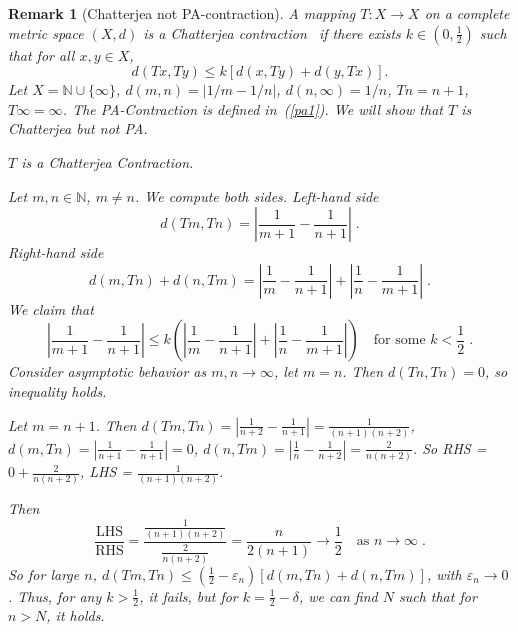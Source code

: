 \documentclass[11pt]{article}
\newtheorem{remark}[theorem]{Remark}
\begin{document}
\begin{remark}[Chatterjea not PA-contraction]
A mapping $ T: X \to X $ on a complete metric space $ (X,d) $ is a Chatterjea contraction~\cite{Chatterjea1972} if there exists $ k \in (0, \frac{1}{2}) $ such that for all $ x, y \in X $,
\begin{equation}
d(Tx, Ty) \leq k \left[ d(x, Ty) + d(y, Tx) \right].
\label{chatterjea}
\end{equation}
Let $ X = \mathbb{N} \cup \{\infty\} $, $ d(m,n) = |1/m - 1/n| $, $ d(n,\infty) 
= 1/n $, $ Tn = n+1 $, $ T\infty = \infty $. 
The PA-Contraction is defined in~(\ref{pa1}). We will show that $T$ is Chatterjea but not PA.


$ T $ is a Chatterjea Contraction.

Let $ m, n \in \mathbb{N} $, $ m \ne n $. We compute both sides.
Left-hand side
\begin{equation}
d(Tm, Tn) = \left| \frac{1}{m+1} - \frac{1}{n+1} \right| \; .
\end{equation}
Right-hand side
\begin{equation}
d(m, Tn) + d(n, Tm) = \left| \frac{1}{m} - \frac{1}{n+1} \right| + \left| \frac{1}{n} - \frac{1}{m+1} \right| \; .
\end{equation}
We claim that
\begin{equation}
\left| \frac{1}{m+1} - \frac{1}{n+1} \right| \leq k \left( \left| \frac{1}{m} - \frac{1}{n+1} \right| + \left| \frac{1}{n} - \frac{1}{m+1} \right| \right)
\quad \text{for some } k < \frac{1}{2} \;.
\end{equation}
Consider asymptotic behavior as $ m, n \to \infty $,
let $ m = n $. Then
$ d(Tn, Tn) = 0 $, so inequality holds.

Let $ m = n+1 $. Then
$ d(Tm, Tn) = \left| \frac{1}{n+2} - \frac{1}{n+1} \right| = \frac{1}{(n+1)(n+2)} $,
$ d(m, Tn) = \left| \frac{1}{n+1} - \frac{1}{n+1} \right| = 0 $,
$ d(n, Tm) = \left| \frac{1}{n} - \frac{1}{n+2} \right| = \frac{2}{n(n+2)} $.
So RHS = $ 0 + \frac{2}{n(n+2)} $, LHS = $ \frac{1}{(n+1)(n+2)} $.

Then
\begin{equation}
\frac{\text{LHS}}{\text{RHS}} = \frac{ \frac{1}{(n+1)(n+2)} }{ \frac{2}{n(n+2)} } = \frac{n}{2(n+1)} \to \frac{1}{2}
\quad \text{as } n \to \infty \; .
\end{equation}
So for large $ n $, $ d(Tm,Tn) \leq \left( \frac{1}{2} - \varepsilon_n \right) [d(m,Tn) + d(n,Tm)] $, with $ \varepsilon_n \to 0 $.
Thus, for any $ k > \frac{1}{2} $, it fails, but for $ k = \frac{1}{2} - \delta $, we can find $ N $ such that for $ n > N $, it holds.


\end{remark}
\end{document}
